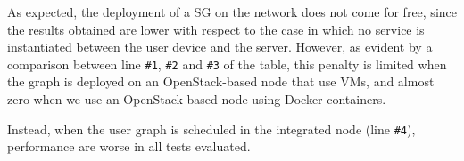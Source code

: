 As expected, the deployment of a SG on the network does not come for free, since the results obtained are lower with respect to the case in which no service is instantiated between the user device and the server.
However, as evident by a comparison between line \texttt{\#1}, \texttt{\#2} and \texttt{\#3} of the table, this penalty is limited when the graph is deployed on an OpenStack-based node that use VMs, and almost zero when we use an OpenStack-based node using Docker containers.

Instead, when the user graph is scheduled in the integrated node (line \texttt{\#4}), performance are worse in all tests evaluated.

